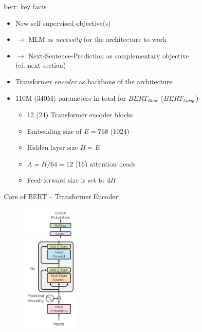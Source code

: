 
\begin{vbframe}{bert: key facts}

\vfill

	\begin{itemize}
		\item New self-supervised objective(s)
		\item[] $\to$ MLM as \textit{necessity} for the architecture to work
		\item[] $\to$ Next-Sentence-Prediction as complementary objective\\(cf. next section)
		\item Transformer \textit{encoder} as backbone of the architecture
		\item 110M (340M) parameters in total for $BERT_{Base}$ ($BERT_{Large}$)
			\begin{itemize}
				\item 12 (24) Transformer encoder blocks
				\item Embedding size of $E = 768$ (1024)
				\item Hidden layer size $H = E$
				\item $A = H/64 = 12$ (16) attention heads
				\item Feed-forward size is set to $4H$
			\end{itemize}
	\end{itemize}

\vfill

\end{vbframe}


\begin{vbframe}{Core of BERT -- Transformer Encoder}

\begin{figure}
	\centering
		\includegraphics[width = 3cm]{figure/bert-top.png}\\ 
		\includegraphics[width = 2.8cm]{figure/bert-bottom.png}\\ 
\end{figure}

\end{vbframe}

